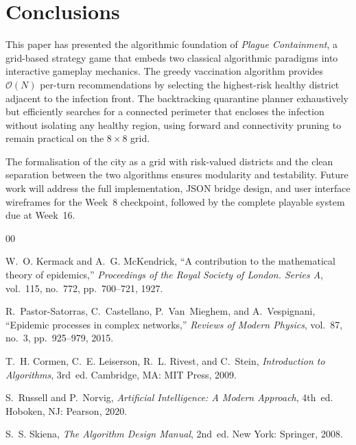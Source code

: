 \documentclass[conference]{IEEEtran}
\begin{document}
\section{Conclusions}
\label{sec:conclusions}

This paper has presented the algorithmic foundation of \emph{Plague Containment}, a
grid-based strategy game that embeds two classical algorithmic paradigms into
interactive gameplay mechanics. The greedy vaccination algorithm provides
$\mathcal{O}(N)$ per-turn recommendations by selecting the highest-risk healthy
district adjacent to the infection front. The backtracking quarantine planner
exhaustively but efficiently searches for a connected perimeter that encloses the
infection without isolating any healthy region, using forward and connectivity
pruning to remain practical on the $8\times8$ grid.

The formalisation of the city as a grid with risk-valued districts and the clean
separation between the two algorithms ensures modularity and testability. Future
work will address the full implementation, JSON bridge design, and user interface
wireframes for the Week~8 checkpoint, followed by the complete playable system
due at Week~16.

\begin{thebibliography}{00}

W.~O. Kermack and A.~G. McKendrick,
``A contribution to the mathematical theory of epidemics,''
\textit{Proceedings of the Royal Society of London. Series A},
vol.~115, no.~772, pp.~700--721, 1927.

R.~Pastor-Satorras, C.~Castellano, P.~Van~Mieghem, and A.~Vespignani,
``Epidemic processes in complex networks,''
\textit{Reviews of Modern Physics},
vol.~87, no.~3, pp.~925--979, 2015.

T.~H. Cormen, C.~E. Leiserson, R.~L. Rivest, and C.~Stein,
\textit{Introduction to Algorithms}, 3rd~ed.
Cambridge, MA: MIT Press, 2009.

S.~Russell and P.~Norvig,
\textit{Artificial Intelligence: A Modern Approach}, 4th~ed.
Hoboken, NJ: Pearson, 2020.

S.~S. Skiena,
\textit{The Algorithm Design Manual}, 2nd~ed.
New York: Springer, 2008.

\end{thebibliography}
\end{document}
